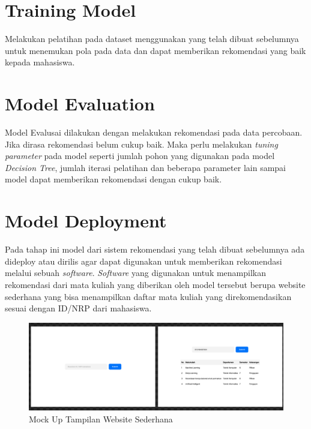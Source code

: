 \section{Training Model}
Melakukan pelatihan pada dataset menggunakan yang telah dibuat sebelumnya untuk menemukan pola pada data dan dapat memberikan rekomendasi yang baik kepada mahasiswa.

\section{Model Evaluation}
Model Evalusai dilakukan dengan melakukan rekomendasi pada data percobaan. Jika dirasa rekomendasi belum cukup baik. Maka perlu melakukan
\emph{tuning parameter} pada model seperti jumlah pohon yang digunakan pada model \emph{Decision Tree}, jumlah iterasi pelatihan dan
beberapa parameter lain sampai model dapat memberikan rekomendasi dengan cukup baik.

\section{Model Deployment}
Pada tahap ini model dari sistem rekomendasi yang telah dibuat sebelumnya ada dideploy atau dirilis agar dapat digunakan untuk memberikan rekomendasi melalui sebuah \emph{software}.
\emph{Software} yang digunakan untuk menampilkan rekomendasi dari mata kuliah yang diberikan oleh model tersebut berupa website sederhana yang bisa menampilkan daftar mata kuliah
yang direkomendasikan sesuai dengan ID/NRP dari mahasiswa.

\begin{figure} [ht] \centering
  \includegraphics[width=160mm]{gambar/mockup.png}
  \caption{Mock Up Tampilan Website Sederhana}
\end{figure}

